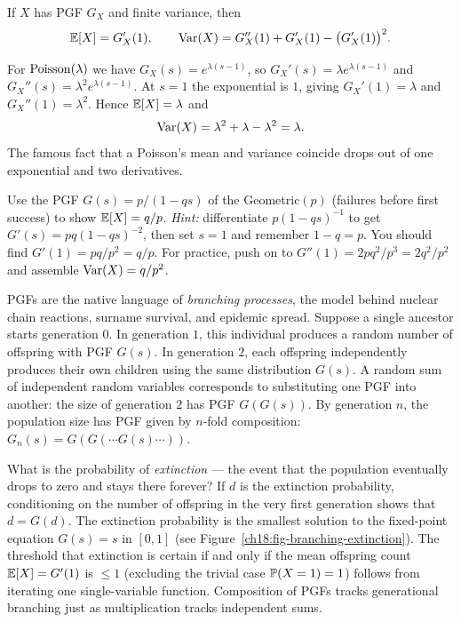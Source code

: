 \begin{proposition}
\label{ch18:prop-pgf-moments}
If $X$ has PGF $G_X$ and finite variance, then
\[
  \E[X] = G_X'(1),
  \qquad
  \Var(X) = G_X''(1) + G_X'(1) - \big(G_X'(1)\big)^2 .
\]
\end{proposition}

\begin{example}
For $\Pois(\lambda)$ we have $G_X(s)=e^{\lambda(s-1)}$, so $G_X'(s)=\lambda
e^{\lambda(s-1)}$ and $G_X''(s)=\lambda^2 e^{\lambda(s-1)}$. At $s=1$ the
exponential is $1$, giving $G_X'(1)=\lambda$ and $G_X''(1)=\lambda^2$. Hence
$\E[X]=\lambda$ and
\[
  \Var(X) = \lambda^2 + \lambda - \lambda^2 = \lambda .
\]
The famous fact that a Poisson's mean and variance coincide drops out of one
exponential and two derivatives.
\end{example}

\begin{walkbox}
Use the PGF $G(s)=p/(1-qs)$ of the Geometric$(p)$ (failures before first
success) to show $\E[X]=q/p$.
\emph{Hint:} differentiate $p(1-qs)^{-1}$ to get $G'(s)=pq(1-qs)^{-2}$, then set
$s=1$ and remember $1-q=p$. You should find $G'(1)=pq/p^2 = q/p$. For practice,
push on to $G''(1)=2pq^2/p^3 = 2q^2/p^2$ and assemble
$\Var(X)=q/p^2$.
\end{walkbox}

\begin{applicationbox}
PGFs are the native language of \emph{branching processes}, the model behind
nuclear chain reactions, surname survival, and epidemic spread. Suppose a single
ancestor starts generation $0$. In generation $1$, this individual produces a
random number of offspring with PGF $G(s)$. In generation $2$, each offspring
independently produces their own children using the same distribution $G(s)$.
A random sum of independent random variables corresponds to substituting one
PGF into another: the size of generation $2$ has PGF $G(G(s))$. By generation
$n$, the population size has PGF given by $n$-fold composition:
$G_n(s) = G(G(\cdots G(s)\cdots))$.

What is the probability of \emph{extinction} --- the event that the population
eventually drops to zero and stays there forever? If $d$ is the extinction
probability, conditioning on the number of offspring in the very first generation
shows that $d = G(d)$. The extinction probability is the smallest solution to
the fixed-point equation $G(s)=s$ in $[0,1]$ (see Figure~\ref{ch18:fig-branching-extinction}). The threshold that extinction is certain if and only if the mean offspring
count $\E[X]=G'(1)$ is $\le 1$ (excluding the trivial case $\P(X=1)=1$) follows
from iterating one single-variable function. Composition of PGFs tracks
generational branching just as multiplication tracks independent sums.
\end{applicationbox}

